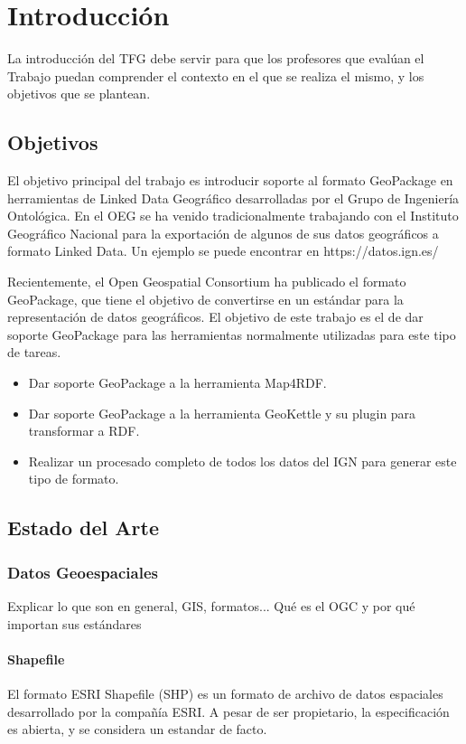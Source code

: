 \chapter{Introducción}
La introducción del TFG debe servir para que los profesores que evalúan el Trabajo puedan comprender el contexto en el que se realiza el mismo, y los objetivos que se plantean.

\section{Objetivos}
El objetivo principal del trabajo es introducir soporte al formato GeoPackage en herramientas de Linked Data
Geográfico desarrolladas por el Grupo de Ingeniería Ontológica.
En el OEG se ha venido tradicionalmente trabajando con el Instituto Geográfico Nacional para la exportación de algunos de sus datos geográficos a formato Linked Data. Un ejemplo se puede encontrar en https://datos.ign.es/

Recientemente, el Open Geospatial Consortium ha publicado el formato GeoPackage, que tiene el objetivo de convertirse en un estándar para la representación de datos geográficos. El objetivo de este trabajo es el de dar soporte GeoPackage para las herramientas normalmente utilizadas para este tipo de tareas.

\begin{itemize}
    \item Dar soporte GeoPackage a la herramienta Map4RDF.
    \item Dar soporte GeoPackage a la herramienta GeoKettle y su plugin para transformar a RDF.
    \item Realizar un procesado completo de todos los datos del IGN para generar este tipo de formato.
\end{itemize}

\section{Estado del Arte}

\subsection{Datos Geoespaciales}
Explicar lo que son en general, GIS, formatos...
Qué es el OGC y por qué importan sus estándares
\subsubsection{Shapefile}
El formato ESRI Shapefile (SHP) es un formato de archivo de datos espaciales desarrollado por la compañía ESRI.
A pesar de ser propietario, la especificación es abierta, y se considera un estandar de facto.

